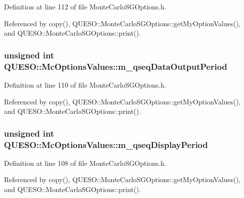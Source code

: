 Definition at line 112 of file Monte\-Carlo\-S\-G\-Options.\-h.



Referenced by copy(), Q\-U\-E\-S\-O\-::\-Monte\-Carlo\-S\-G\-Options\-::get\-My\-Option\-Values(), and Q\-U\-E\-S\-O\-::\-Monte\-Carlo\-S\-G\-Options\-::print().

\hypertarget{class_q_u_e_s_o_1_1_mc_options_values_a8680e9d1886eb0a5d0e5b856b2471dfa}{
\subsubsection[{m\-\_\-qseq\-Data\-Output\-Period}]{\setlength{\rightskip}{0pt plus 5cm}unsigned int Q\-U\-E\-S\-O\-::\-Mc\-Options\-Values\-::m\-\_\-qseq\-Data\-Output\-Period}}\label{class_q_u_e_s_o_1_1_mc_options_values_a8680e9d1886eb0a5d0e5b856b2471dfa}


Definition at line 110 of file Monte\-Carlo\-S\-G\-Options.\-h.



Referenced by copy(), Q\-U\-E\-S\-O\-::\-Monte\-Carlo\-S\-G\-Options\-::get\-My\-Option\-Values(), and Q\-U\-E\-S\-O\-::\-Monte\-Carlo\-S\-G\-Options\-::print().

\hypertarget{class_q_u_e_s_o_1_1_mc_options_values_a4ab5a0e5c5d3d47fa15516d98739ae25}{
\subsubsection[{m\-\_\-qseq\-Display\-Period}]{\setlength{\rightskip}{0pt plus 5cm}unsigned int Q\-U\-E\-S\-O\-::\-Mc\-Options\-Values\-::m\-\_\-qseq\-Display\-Period}}\label{class_q_u_e_s_o_1_1_mc_options_values_a4ab5a0e5c5d3d47fa15516d98739ae25}


Definition at line 108 of file Monte\-Carlo\-S\-G\-Options.\-h.



Referenced by copy(), Q\-U\-E\-S\-O\-::\-Monte\-Carlo\-S\-G\-Options\-::get\-My\-Option\-Values(), and Q\-U\-E\-S\-O\-::\-Monte\-Carlo\-S\-G\-Options\-::print().

